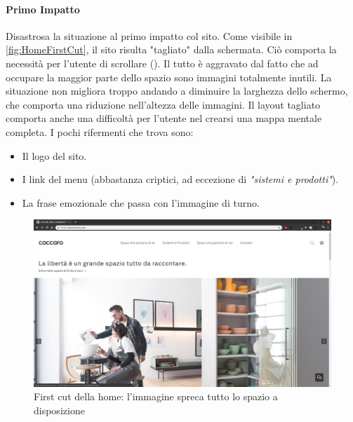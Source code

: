 \paragraph*{Primo Impatto}
Disastrosa la situazione al primo impatto col sito. Come visibile in \autoref{fig:HomeFirstCut}, il sito risulta "tagliato" dalla schermata. Ciò comporta la necessità per l'utente di scrollare (). Il tutto è aggravato dal fatto che ad occupare la maggior parte dello spazio sono immagini totalmente inutili. La situazione non migliora troppo andando a diminuire la larghezza dello schermo, che comporta una riduzione nell'altezza delle immagini.
Il layout tagliato comporta anche una difficoltà per l'utente nel crearsi una mappa mentale completa. I pochi rifermenti che trova sono:
\begin{itemize}
	\item Il logo del sito.
	\item I link del menu (abbastanza criptici, ad eccezione di \textit{"sistemi e prodotti"}).
	\item La frase emozionale che passa con l'immagine di turno.
\end{itemize}
%


\begin{figure}
	\centering
	\includegraphics[width=\textwidth]{sez/HomePage/img/HomeFirstCut.png}
	\caption[https://www.caccaro.com/]{First cut della home: l'immagine spreca tutto lo spazio a disposizione}
	\label{fig:HomeFirstCut}
\end{figure}

